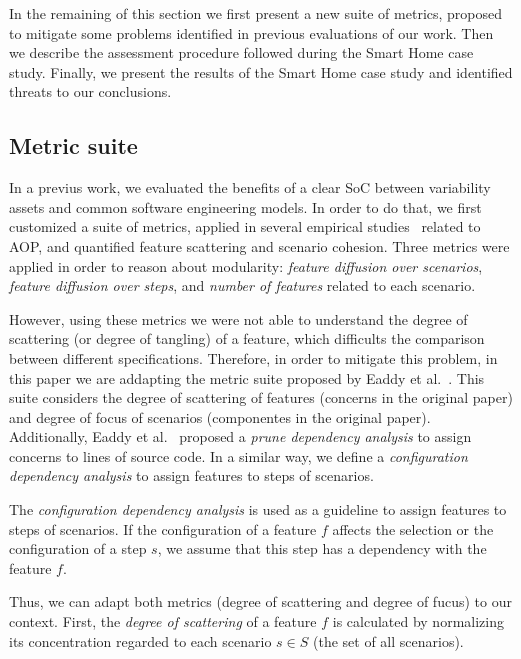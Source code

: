 \documentclass{acm_proc_article-sp}
\begin{document}
In the remaining of this section we first present a new suite of metrics,
proposed to mitigate some problems identified in previous evaluations of our
work. Then we describe the assessment procedure followed during the Smart Home
case study. Finally, we present the results of the Smart Home case study and
identified threats to our conclusions. 

\subsection{Metric suite}

In a previus work, we evaluated the benefits of a clear SoC between variability
assets and common software engineering models. In order to do that, we first
customized a suite of metrics, applied in several empirical
studies~\cite{Garcia:2005aa,Greenwood:2007aa,Figueiredo:2008ab,Figueiredo:2008ab}
related to AOP, and quantified feature scattering and scenario cohesion. Three
metrics were applied in order to reason about modularity: \emph{feature diffusion
over scenarios}, \emph{feature diffusion over steps}, and \emph{number of
features} related to each scenario.

However, using these metrics we were not able to understand the degree of
scattering (or degree of tangling) of a feature, which difficults the comparison
between different specifications. Therefore, in order to mitigate this problem,
in this paper we are addapting the metric suite proposed by Eaddy et
al.~\cite{Eaddy:2007aa}. This suite considers the degree of scattering of
features (concerns in the original paper) and degree of focus of scenarios (componentes
in the original paper). Additionally,
Eaddy et al.~\cite{Eaddy:2007aa} proposed a \emph{prune dependency analysis} to
assign concerns to lines of source code. In a similar way, we define a
\emph{configuration dependency analysis} to assign features to steps of
scenarios.

\begin{definition}
The \emph{configuration dependency analysis} is used as a guideline to assign
features to steps of scenarios. If the configuration of a feature $f$
affects the selection or the configuration of a step $s$, we assume that this step has a
dependency with the feature $f$. 
\end{definition}

Thus, we can adapt both metrics (degree of scattering and degree of fucus) to
our context. First, the \emph{degree of scattering} of a feature $f$ is
calculated by normalizing its concentration regarded to each scenario $s \in
S$ (the set of all scenarios). 
\end{document}

